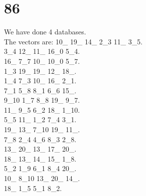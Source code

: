\chapter{86}
\indent We have done 4 databases.\\
The vectors are:
10\_ 19\_ 14\_ 2\_3 11\_ 3\_5.\\3\_4 12\_ 11\_ 16\_0 5\_4.\\16\_ 7\_7 10\_ 10\_0 5\_7.\\1\_3 19\_ 19\_ 12\_ 18\_.\\1\_4 7\_3 10\_ 16\_ 2\_1.\\7\_1 5\_8 8\_1 6\_6 15\_.\\9\_10 1\_7 8\_8 19\_ 9\_7.\\11\_ 9\_5 6\_2 18\_ 1\_10.\\5\_5 11\_ 1\_2 7\_4 3\_1.\\19\_ 13\_ 7\_10 19\_ 11\_.\\7\_8 2\_4 4\_6 8\_3 2\_8.\\13\_ 20\_ 13\_ 17\_ 20\_.\\18\_ 13\_ 14\_ 15\_ 1\_8.\\5\_2 1\_9 6\_1 8\_4 20\_.\\10\_ 8\_10 13\_ 20\_ 14\_.\\18\_ 1\_5 5\_1 8\_2.\\